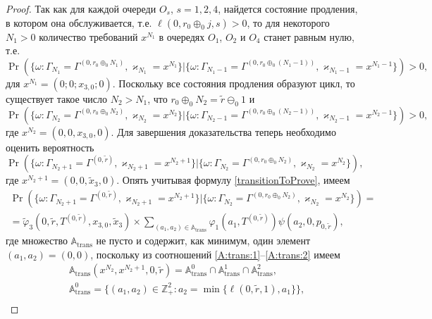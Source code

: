 \documentclass{report}
\begin{document}
\begin{proof}
Так как для каждой очереди $O_s$, $s=1,2,4$, найдется состояние продления, в котором она обслуживается, т.е. $\ell(0,r_0\oplus_{0}j,s)>0$, то для некоторого $N_1>0$ количество требований $x^{N_1}$ в очередях $O_1$, $O_2$ и $O_4$ станет равным нулю, т.е. 
\begin{equation*}
\Pr (\{\omega\colon\Gamma_{N_1}=\Gamma^{(0,r_0\oplus_{0}N_1)},\varkappa_{N_1}=x^{N_1} \}| \{\omega\colon\Gamma_{N_1-1}=\Gamma^{(0,r_0\oplus_{0}(N_1-1))},\varkappa_{N_1-1}=x^{N_1-1}\}) > 0,
\end{equation*}
для $x^{N_1}  =\left(0;0; x_{3,0};0\right)$. Поскольку все состояния продления образуют цикл, то существует такое число $N_2>N_1$, что $r_0 \oplus_0  N_2 = \tilde{r} \ominus_0 1$ и 
\begin{equation*}
\Pr (\{\omega\colon\Gamma_{N_2}=\Gamma^{(0,r_0\oplus_{0}N_2)},\varkappa_{N_2}=x^{N_2} \}| \{\omega\colon\Gamma_{N_2-1}=\Gamma^{(0,r_0\oplus_{0}(N_2-1))},\varkappa_{N_2-1}=x^{N_2-1}\}) > 0,
\end{equation*}
где $x^{N_2} = (0,0,x_{3,0},0)$.
Для завершения доказательства теперь необходимо оценить вероятность 
\begin{equation*}
\Pr (\{\omega\colon\Gamma_{N_2+1}=\Gamma^{(0,\tilde{r})},\varkappa_{N_2+1}= x^{N_2+1} \}| \{\omega\colon\Gamma_{N_2}=\Gamma^{(0,r_0\oplus_{0}N_2)},\varkappa_{N_2}=x^{N_2}\}),
\end{equation*}
где $x^{N_2+1} = (0,0,\tilde{x}_3,0)$.
Опять учитывая формулу \eqref{transitionToProve}, имеем
\begin{multline*}
\Pr (\{\omega\colon\Gamma_{N_2+1}=\Gamma^{(0,\tilde{r})},\varkappa_{N_2+1}=x^{N_2+1} \}| \{\omega\colon\Gamma_{N_2}=\Gamma^{(0,r_0\oplus_{0}N_2)},\varkappa_{N_2}=x^{N_2}\})=\\
=\widetilde{\varphi}_3(0,\tilde{r},T^{(0,\tilde{r})},x_{3,0},\tilde{x}_3)
\times
\sum_{(a_1,a_2)\in {\mathbb A}_{\mathrm{trans}}}\varphi_1(a_1,T^{(0,\tilde{r})})  \psi(a_2,0, p_{0,\tilde{r}}),
\end{multline*}
где множество ${\mathbb A}_{\mathrm{trans}}$ не пусто и содержит, как минимум, один элемент $(a_1,a_2)=(0,0)$, поскольку из соотношений \eqref{A:trans:1}--\eqref{A:trans:2} имеем
\begin{align*}
&{\mathbb A}_{\mathrm{trans}}(x^{N_2},x^{N_2+1},0,\tilde{r}) = {\mathbb A}_{\mathrm{trans}}^0 \cap {\mathbb A}_{\mathrm{trans}}^1\cap {\mathbb A}_{\mathrm{trans}}^2,\\
&{\mathbb A}_{\mathrm{trans}}^0 = \{(a_1,a_2) \in \mathbb{Z}_+^2 \colon a_2 = \min{\{\ell(0,\tilde{r},1), a_1}\} \},\\

\end{align*}
\end{proof}
\end{document}
